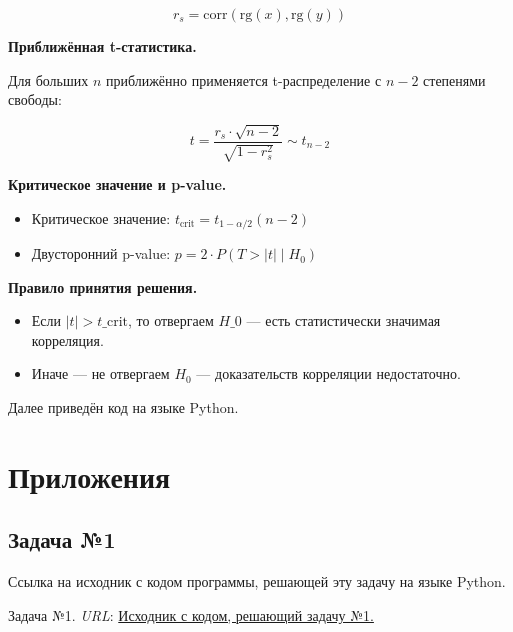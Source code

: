\documentclass[12pt]{article}
\begin{document}
	$$ r_s = \text{corr}(\text{rg}(x), \text{rg}(y)) $$
	\vspace*{1em}
	
	\textbf{Приближённая t-статистика.}
	
	Для больших $ n $ приближённо применяется t-распределение с $ n - 2 $ степенями свободы:
	
	$$ t = \frac{r_s \cdot \sqrt{n - 2}}{\sqrt{1 - r_s^2}} \sim t_{n-2} $$
	\vspace*{1em}
	
	\textbf{Критическое значение и p-value.}
	
	\begin{itemize}
		\item Критическое значение:
		$t_{\text{crit}} = t_{1 - \alpha / 2}(n - 2)$
		\item Двусторонний p-value:
		$p = 2 \cdot P(T > |t| \mid H_0)$
	\end{itemize}
	\vspace*{1em}
	
	\textbf{Правило принятия решения.}
	
	\begin{itemize}
		\item Если $ |t| > t\_{\text{crit}} $, то отвергаем $ H\_0 $ — есть статистически значимая корреляция.
		\item Иначе — не отвергаем $ H_0 $ — доказательств корреляции недостаточно.
	\end{itemize}
	
	Далее приведён код на языке Python.
	\section*{Приложения}
	
	\subsection*{Задача №1}
	
	Ссылка на исходник с кодом программы, решающей эту задачу на языке Python. \cite{TaskNumber1}
	\newpage
	
	\begin{thebibliography}{99}
		Задача №1. \textit{URL}: \href{https://colab.research.google.com/drive/1ViTlo3eksmFZN0RmQYRjO1QAUtpfM8Ru?usp=sharing}{Исходник с кодом, решающий задачу №1.}
	\end{thebibliography}
	
\end{document}

